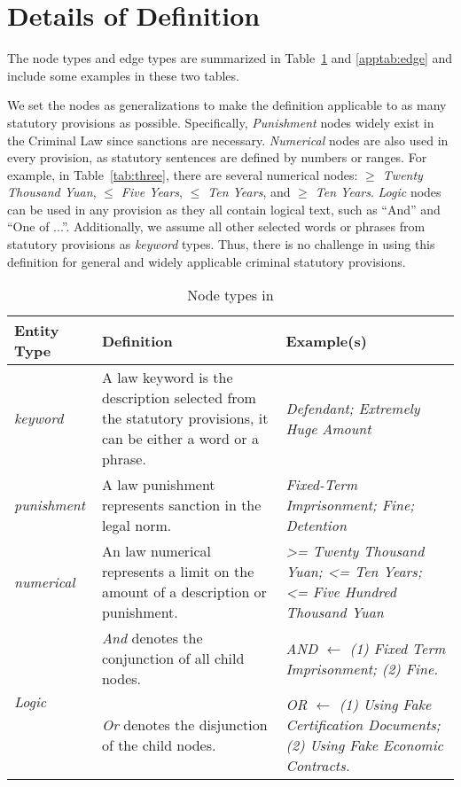 \section{Details of \lawgraph{} Definition}
\label{app:e}

The node types and edge types are summarized in Table~\ref{apptab:L_node_t} and \ref{apptab:edge} and include some examples in these two tables. 



We set the nodes as generalizations to make the \lawgraph{} definition applicable to as many statutory provisions as possible. Specifically, \textit{Punishment} nodes widely exist in the Criminal Law since sanctions are necessary. \textit{Numerical} nodes are also used in every provision, as statutory sentences are defined by numbers or ranges. For example, in Table~\ref{tab:three}, there are several numerical nodes: \textit{$\geq$ Twenty Thousand Yuan}, \textit{$\leq$ Five Years}, \textit{$\leq$ Ten Years}, and \textit{$\geq$ Ten Years}. \textit{Logic} nodes can be used in any provision as they all contain logical text, such as ``And'' and ``One of ...''. Additionally, we assume all other selected words or phrases from statutory provisions as \textit{keyword} types. Thus, there is no challenge in using this definition for general and widely applicable criminal statutory provisions.

\begin{table}[!h]
    \centering
    \small
    \begin{tabular}{p{}p{}p{}}
    \toprule
        Entity Type & Definition & Example(s)  \\
        \hline
        \textit{keyword} & A law keyword is the description selected from the statutory provisions, it can be either a word or a phrase. & \textit{Defendant; Extremely Huge Amount}\\
        \hline
        \textit{punishment} & A law punishment represents sanction in the legal norm. & \textit{Fixed-Term Imprisonment; Fine; Detention}\\
        \hline
        \textit{numerical} & An law numerical represents a limit on the amount of a description or punishment. & \textit{>= Twenty Thousand Yuan; <= Ten Years; <= Five Hundred Thousand Yuan}\\
        \hline
        \multirow{2}{*}{\textit{Logic}} & \textit{And} denotes the conjunction of all child nodes.  & \textit{AND ${\longleftarrow}$ (1) Fixed Term Imprisonment; (2) Fine.} \\
        \cline{2-3}
        & \textit{Or} denotes the disjunction of the child nodes. & 
        \textit{OR {${\longleftarrow}$} (1) Using Fake Certification Documents; (2) Using Fake Economic Contracts.}\\
        \bottomrule
    \end{tabular}
    \caption{Node types in \lawgraph{}}
    \label{apptab:L_node_t}
\end{table}

